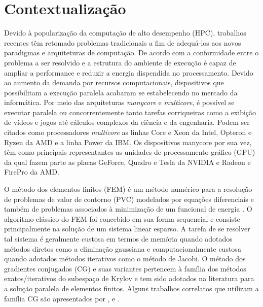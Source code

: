 \documentclass[
    12pt,               %
    openright,          %
    oneside,
    a4paper,            %
    english,            %
    french,             %
    spanish,            %
    brazil              %
    ]{abntex2}
\begin{document}
\textual

\chapter{Contextualização}
	Devido à popularização da computação de alto desempenho (HPC), trabalhos recentes têm retomado problemas tradicionais a fim de adequá-los aos novos paradigmas e arquiteturas de computação. De acordo com  a conformidade entre o problema a ser resolvido e a estrutura do ambiente de execução é capaz de ampliar a performance e reduzir a energia dispendida no processamento.
	Devido ao aumento da demanda por recursos computacionais, dispositivos que possibilitam a execução paralela acabaram se estabelecendo no mercado da informática.
	Por meio das arquiteturas \textit{manycore} e \textit{multicore}, é possível se executar paralela ou concorrentemente tanto tarefas corriqueiras como a exibição de vídeos e jogos até cálculos complexos da ciência e da engenharia.
	Podem ser citados como processadores \textit{multicore} as linhas Core e Xeon da Intel\nocite{intel}, Opteron e Ryzen da AMD\nocite{amd} e a linha Power da IBM\nocite{ibm}. Os dispositivos manycore por sua vez, têm como principais representantes as unidades de processamento gráfico (GPU) da qual fazem parte as placas GeForce, Quadro e Tesla da NVIDIA\nocite{nvidia} e Radeon e FirePro da AMD\nocite{amd}.
	
	O método dos elementos finitos (FEM) é um método numérico para a resolução de problemas de valor de contorno (PVC) modelados por equações diferenciais e também de problemas associados à minimização de um funcional de energia \cite{Szabo2009}. O algoritmo clássico do FEM foi concebido em sua forma sequencial e consiste principalmente na solução de um sistema linear esparso. A tarefa de se resolver tal sistema é geralmente custosa em termos de memória quando adotados métodos diretos como a eliminação gaussiana e computacionalmente custosa quando adotados métodos iterativos como o método de Jacobi.
	O método dos gradientes conjugados (CG) e suas variantes pertencem à família dos métodos exatos/iterativos do subespaço de Krylov \cite{Anzt2016} e tem sido adotados na literatura para a solução paralela de elementos finitos. Alguns trabalhos correlatos que utilizam a família CG são apresentados por ,  e .
	
\end{document}
